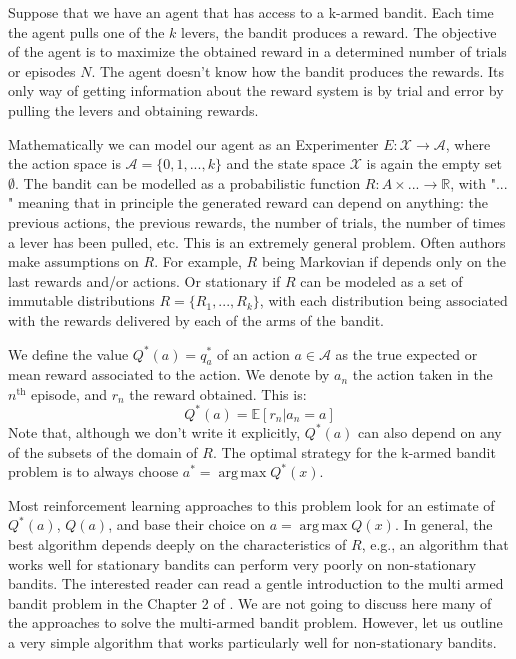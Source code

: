 \documentclass[11pt,a4paper,twoside]{report}
\DeclareMathOperator*{\argmax}{arg\,max}
\newcommand{\+}{\textnormal{+} }
\theoremstyle{definition}
\numberwithin{equation}{chapter}
\begin{document}
Suppose that we have an agent that has access to a k-armed bandit. Each time the
agent pulls one of the $k$ levers, the bandit produces a reward. The objective
of the agent is to maximize the obtained reward in a determined number of trials
or episodes $N$. The agent doesn't know how the bandit produces the rewards. Its
only way of getting information about the reward system is by trial and error by
pulling the levers and obtaining rewards.

Mathematically we can model our agent as an Experimenter
$E:\mathcal{X}\rightarrow\mathcal{A}$, where the action space is
$\mathcal{A}=\{0,1,...,k\}$ and the state space $\mathcal{X}$ is again the empty
set $\emptyset$. The bandit can be modelled as a probabilistic function
$R:A\times ... \rightarrow \mathbb{R}$, with "$...$" meaning that in principle
the generated reward can depend on anything: the previous actions, the previous
rewards, the number of trials, the number of times a lever has been pulled, etc.
This is an extremely general problem. Often authors make assumptions on $R$. For
example, $R$ being Markovian if depends only on the last rewards and/or actions.
Or stationary if $R$ can be modeled as a set of immutable distributions
$R=\{R_1,... , R_k\}$, with each distribution being associated with the rewards
delivered by each of the arms of the bandit.

We define the value $Q^*(a)=q^*_a$ of an action $a \in \mathcal{A}$ as the true
expected or mean reward associated to the action. We denote by $a_n$ the action
taken in the $n^\text{th}$ episode, and $r_n$ the reward obtained. This is:
\begin{equation}
  Q^*(a) = \mathbb{E}[r_n|a_n = a]
\end{equation}
Note that, although we don't write it explicitly, $Q^*(a)$ can also depend on 
any of the subsets of the domain of $R$.
The optimal strategy for the k-armed bandit problem is to always choose 
$a^*=\argmax Q^*(x)$.

Most reinforcement learning approaches to this problem look for an estimate of
$Q^*(a)$, $Q(a)$, and base their choice on $a=\argmax Q(x)$. In general, the
best algorithm depends deeply on the characteristics of $R$, e.g., an algorithm
that works well for stationary bandits can perform very poorly on non-stationary
bandits. The interested reader can read a gentle introduction to the multi armed
bandit problem in the Chapter 2 of \cite{sutton2018reinforcement}. We are not
going to discuss here many of the approaches to solve the multi-armed bandit
problem. However, let us outline a very simple algorithm that works particularly
well for non-stationary bandits. 
\end{document}
